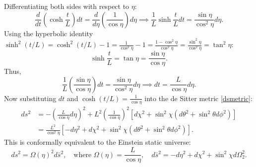 \documentclass[12pt]{article}
\begin{document}
\begin{enumerate}[label=\alph*)]
Differentiating both sides with respect to $\eta$:
\begin{equation}
\frac{d}{dt}\left(\cosh\frac{t}{L}\right) dt = \frac{d}{d\eta}\left(\frac{1}{\cos\eta}\right) d\eta \implies \frac{1}{L} \sinh\frac{t}{L} dt = \frac{\sin\eta}{\cos^2\eta} d\eta.
\end{equation}
Using the hyperbolic identity $\sinh^2(t/L) = \cosh^2(t/L) - 1 = \frac{1}{\cos^2\eta} - 1 = \frac{1 - \cos^2\eta}{\cos^2\eta} = \frac{\sin^2\eta}{\cos^2\eta} = \tan^2\eta$:
\begin{equation}
\sinh\frac{t}{L} = \tan\eta = \frac{\sin\eta}{\cos\eta}.
\end{equation}
Thus,
\begin{equation}
\frac{1}{L} \left(\frac{\sin\eta}{\cos\eta}\right) dt = \frac{\sin\eta}{\cos^2\eta} d\eta \implies dt = \frac{L}{\cos\eta} d\eta.
\end{equation}
Now substituting $dt$ and $\cosh(t/L) = \frac{1}{\cos\eta}$ into the de Sitter metric \eqref{dsmetric}:
\begin{align}
ds^2 &= - \left(\frac{L}{\cos\eta} d\eta\right)^2 + L^2 \left(\frac{1}{\cos\eta}\right)^2 \left[ d\chi^2 + \sin^2\chi (d\theta^2 + \sin^2\theta d\phi^2) \right] \nonumber \\
&= \frac{L^2}{\cos^2\eta} \left[ - d\eta^2 + d\chi^2 + \sin^2\chi (d\theta^2 + \sin^2\theta d\phi^2) \right].
\end{align}
This is conformally equivalent to the Einstein static universe:
\begin{equation}
ds^2 = \Omega(\eta)^2 d\bar{s}^2, \quad \text{where } \Omega(\eta) = \frac{L}{\cos\eta}, \quad d\bar{s}^2 = - d\eta^2 + d\chi^2 + \sin^2\chi d\Omega_2^2.
\end{equation}


\end{enumerate}
\end{document}

